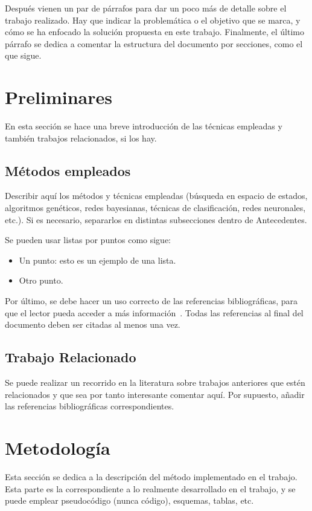 \documentclass[conference,a4paper]{IEEEtran}
\begin{document}
Después vienen un par de párrafos para dar un poco más de detalle sobre el
trabajo realizado. Hay que indicar la problemática o el objetivo que se marca,
y cómo se ha enfocado la solución propuesta en este trabajo. Finalmente, el
último párrafo se dedica a comentar la estructura del documento por secciones,
como el que sigue.


\section{Preliminares}

En esta sección se hace una breve introducción de las técnicas empleadas y
también trabajos relacionados, si los hay.


\subsection{Métodos empleados}

Describir aquí los métodos y técnicas empleadas (búsqueda en espacio de
estados, algoritmos genéticos, redes bayesianas, técnicas de clasificación,
redes neuronales, etc.). Si es necesario, separarlos en distintas subsecciones
dentro de Antecedentes.

Se pueden usar listas por puntos como sigue:
\begin{itemize}
\item Un punto: esto es un ejemplo de una lista.
\item Otro punto.
\end{itemize}

Por último, se debe hacer un uso correcto de las referencias bibliográficas,
para que el lector pueda acceder a más información~\cite{b2}. Todas las
referencias al final del documento deben ser citadas al menos una vez.


\subsection{Trabajo Relacionado}

Se puede realizar un recorrido en la literatura sobre trabajos anteriores que
estén relacionados y que sea por tanto interesante comentar aquí. Por supuesto,
añadir las referencias bibliográficas correspondientes.


\section{Metodología}

Esta sección se dedica a la descripción del método implementado en el trabajo.
Esta parte es la correspondiente a lo realmente desarrollado en el trabajo, y
se puede emplear pseudocódigo (nunca código), esquemas, tablas, etc.
\end{document}
